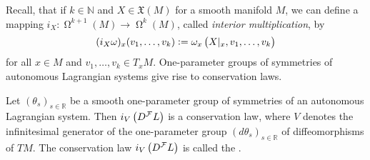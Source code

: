 Recall, that if $k \in \mathbb{N}$ and $X \in \mathfrak{X}(M)$ for a smooth manifold $M$, we can define a mapping $i_X : \upOmega^{k + 1}(M) \to \upOmega^k(M)$, called \emph{interior multiplication}, by
\begin{equation*}
	(i_X\omega)_x(v_1,\dots,v_k) := \omega_x\del[1]{X\vert_x,v_1,\dots,v_k}
\end{equation*}
\noindent for all $x \in M$ and $v_1,\dots,v_k \in T_xM$. One-parameter groups of symmetries of autonomous Lagrangian systems give rise to conservation laws. 

\begin{theorem}
	\label{thm:Noethers_theorem_Lagrangian_version}	
	Let $(\theta_s)_{s \in \mathbb{R}}$ be a smooth one-parameter group of symmetries of an autonomous Lagrangian system. Then $i_V\del[1]{D^\mathcal{F}L}$ is a conservation law, where $V$ denotes the infinitesimal generator of the one-parameter group $(d\theta_s)_{s \in \mathbb{R}}$ of diffeomorphisms of $TM$. The conservation law $i_V\del[1]{D^\mathcal{F}L}$ is called the .
\end{theorem}

